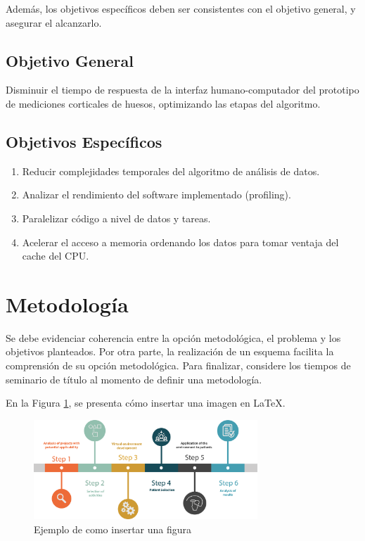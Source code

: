 Además, los objetivos específicos deben ser consistentes con el objetivo general,
y asegurar el alcanzarlo.

\subsection{Objetivo General}
\label{sc:OG}
Disminuir el tiempo de respuesta de la interfaz humano-computador del prototipo
de mediciones corticales de huesos, optimizando las etapas del algoritmo.


\subsection{Objetivos Específicos}
\label{ssc:OE}
\begin{enumerate}
	\item Reducir complejidades temporales del algoritmo de análisis de datos.
	\item Analizar el rendimiento del software implementado (profiling).
	\item Paralelizar código a nivel de datos y tareas.
	\item Acelerar el acceso a memoria ordenando los datos para tomar ventaja del cache del CPU.
\end{enumerate}





\section{Metodología}
\label{sc:Met}

Se debe evidenciar coherencia entre la opción metodológica, el problema y los
objetivos planteados.
Por otra parte, la realización de un esquema facilita la comprensión de su
opción metodológica. Para finalizar, considere los tiempos de seminario de
título al momento de definir una metodología.


En la Figura \ref{fig:met}, se presenta cómo insertar una imagen en \LaTeX{}.
\begin{figure}[H]
    \centering
    \includegraphics[width=0.75\textwidth]{imagenes/Fig_ejMet.png}
    \caption{Ejemplo de como insertar una figura}
    \label{fig:met}
\end{figure}



